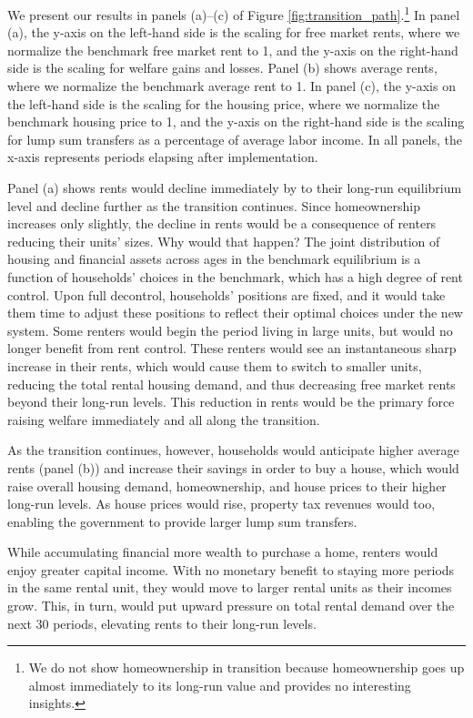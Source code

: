 \documentclass[parskip=full]{article}
\begin{document}
We present our results in panels (a)--(c) of Figure \ref{fig:transition_path}.\footnote{We do not show homeownership in transition because homeownership goes up almost immediately to its long-run value and provides no interesting insights.} In panel (a), the y-axis on the left-hand side is the scaling for free market rents, where we normalize the benchmark free market rent to 1, and the y-axis on the right-hand side is the scaling for welfare gains and losses. Panel (b) shows average rents, where we normalize the benchmark average rent to 1. In panel (c), the y-axis on the left-hand side is the scaling for the housing price, where we normalize the benchmark housing price to 1, and the y-axis on the right-hand side is the scaling for lump sum transfers as a percentage of average labor income. In all panels, the x-axis represents periods elapsing after implementation.

Panel (a) shows rents would decline immediately by to their long-run equilibrium level and decline further as the transition continues. Since homeownership increases only slightly, the decline in rents would be a consequence of renters reducing their units' sizes. Why would that happen? The joint distribution of housing and financial assets across ages in the benchmark equilibrium is a function of households' choices in the benchmark, which has a high degree of rent control. Upon full decontrol, households' positions are fixed, and it would take them time to adjust these positions to reflect their optimal choices under the new system. Some renters would begin the period living in large units, but would no longer benefit from rent control. These renters would see an instantaneous sharp increase in their rents, which would cause them to switch to smaller units, reducing the total rental housing demand, and thus decreasing free market rents beyond their long-run levels. This reduction in rents would be the primary force raising welfare immediately and all along the transition. 

As the transition continues, however, households would anticipate higher average rents (panel (b)) and increase their savings in order to buy a house, which would raise overall housing demand, homeownership, and house prices to their higher long-run levels. As house prices would rise, property tax revenues would too, enabling the government to provide larger lump sum transfers.

While accumulating financial more wealth to purchase a home, renters would enjoy greater capital income. With no monetary benefit to staying more periods in the same rental unit, they would move to larger rental units as their incomes grow. This, in turn, would put upward pressure on total rental demand over the next 30 periods, elevating rents to their long-run levels.
\end{document}
